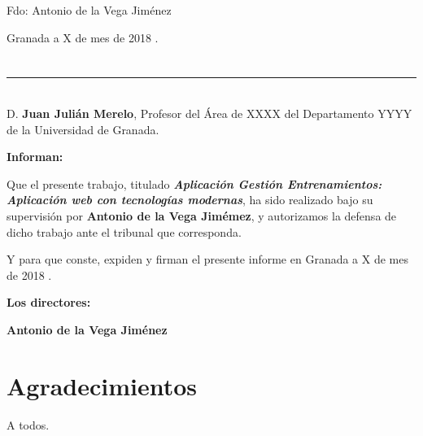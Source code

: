 \noindent Fdo: Antonio de la Vega Jiménez

\vspace{2cm}

\begin{flushright}
Granada a X de mes de 2018 .
\end{flushright}


\chapter*{}
\thispagestyle{empty}

\noindent\rule[-1ex]{\textwidth}{2pt}\\[4.5ex]

D. \textbf{Juan Julián Merelo}, Profesor del Área de XXXX del Departamento YYYY de la Universidad de Granada.

\vspace{0.5cm}

\textbf{Informan:}

\vspace{0.5cm}

Que el presente trabajo, titulado \textit{\textbf{Aplicación Gestión Entrenamientos: Aplicación web con tecnologías modernas}},
ha sido realizado bajo su supervisión por \textbf{Antonio de la Vega Jimémez}, y autorizamos la defensa de dicho trabajo ante el tribunal
que corresponda.

\vspace{0.5cm}

Y para que conste, expiden y firman el presente informe en Granada a X de mes de 2018 .

\vspace{1cm}

\textbf{Los directores:}

\vspace{5cm}

\noindent \textbf{Antonio de la Vega Jiménez \ \ \ \ \ }

\chapter*{Agradecimientos}
\thispagestyle{empty}

       \vspace{1cm}


A todos.

